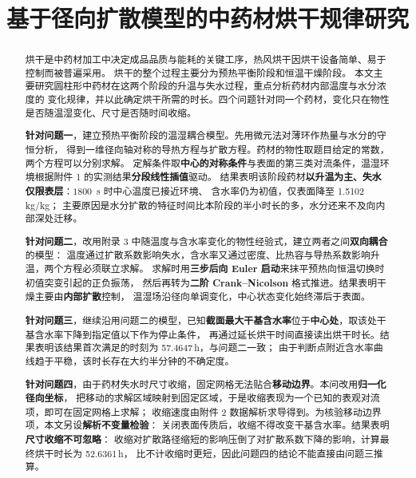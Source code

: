 \documentclass[12pt,a4paper]{ctexart}
\title{基于径向扩散模型的中药材烘干规律研究}
\author{}
\date{}
\newcommand{\qoneCsurfaceoneeightzerozeros}{1.5102\,kg/kg}
\newcommand{\qtwodryingtime}{57.4647\,h}
\newcommand{\qfourdryingtimehours}{52.6361\,h}
\begin{document}
\maketitle

\begin{abstract}
\begin{small}\linespread{1.22}\selectfont
\setlength{\parskip}{1pt}
烘干是中药材加工中决定成品品质与能耗的关键工序，热风烘干因烘干设备简单、易于控制而被普遍采用。
烘干的整个过程主要分为预热平衡阶段和恒温干燥阶段。
本文主要研究圆柱形中药材在这两个阶段的升温与失水过程，重点分析药材内部温度与水分浓度的
变化规律，并以此确定烘干所需的时长。四个问题针对同一个药材，变化只在物性是否随温湿变化、尺寸是否随时间收缩。

\textbf{针对问题一}，建立预热平衡阶段的温湿耦合模型。先用微元法对薄环作热量与水分的守恒分析，
得到一维径向轴对称的导热方程与扩散方程。药材的物性取题目给定的常数，两个方程可以分别求解。
定解条件取\textbf{中心的对称条件}与表面的第三类对流条件，温湿环境根据附件 1 的实测结果\textbf{分段线性插值}驱动。
结果表明该阶段药材\textbf{以升温为主、失水仅限表层}：$1800$~s 时中心温度已接近环境、
含水率仍为初值，仅表面降至 \qoneCsurfaceoneeightzerozeros；
主要原因是水分扩散的特征时间比本阶段的半小时长的多，水分还来不及向内部深处迁移。

\textbf{针对问题二}，改用附录 3 中随温度与含水率变化的物性经验式，建立两者之间\textbf{双向耦合}的模型：
温度通过扩散系数影响失水，含水率又通过密度、比热容与导热系数影响升温，两个方程必须联立求解。
求解时用\textbf{三步后向 Euler 启动}来抹平预热向恒温切换时初值突变引起的正负振荡，
然后再转为\textbf{二阶 Crank--Nicolson} 格式推进。结果表明干燥主要由\textbf{内部扩散}控制，
温湿场沿径向单调变化，中心状态变化始终滞后于表面。

\textbf{针对问题三}，继续沿用问题二的模型，已知\textbf{截面最大干基含水率}位于\textbf{中心处}，取该处干基含水率下降到指定值以下作为停止条件，
再通过延长烘干时间直接读出烘干时长。结果表明该结果首次满足的时刻为 \qtwodryingtime，与问题二一致；
由于判断点附近含水率曲线趋于平稳，该时长存在大约半分钟的不确定度。

\textbf{针对问题四}，由于药材失水时尺寸收缩，固定网格无法贴合\textbf{移动边界}。本问改用\textbf{归一化径向坐标}，
把移动的求解区域映射到固定区域，于是收缩表现为一个已知的表观对流项，即可在固定网格上求解；
收缩速度由附件 2 数据解析求导得到。为核验移动边界项，本文另设\textbf{解析不变量检验}：
关闭表面传质后，收缩不得改变干基含水率。结果表明\textbf{尺寸收缩不可忽略}：
收缩对扩散路径缩短的影响压倒了对扩散系数下降的影响，计算最终烘干时长为 \qfourdryingtimehours，
比不计收缩时更短，因此问题四的结论不能直接由问题三推算。


\end{small}
\end{abstract}
\end{document}
